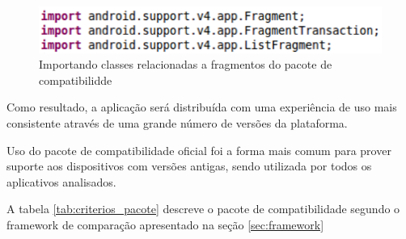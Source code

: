 \begin{figure}[ht]
\centering
\includegraphics{imagens/import_fragment_compat.png}
\caption{Importando classes relacionadas a fragmentos do pacote de compatibilidde}
\label{fig:import_fragment_compat}
\end{figure}

Como resultado, a aplicação será distribuída com uma experiência de uso mais
consistente através de uma grande número de versões da plataforma.

Uso do pacote de compatibilidade oficial foi a forma mais comum para prover
suporte aos dispositivos com versões antigas, sendo utilizada por todos os
aplicativos analisados.

A tabela \ref{tab:criterios_pacote} descreve o pacote de compatibilidade
segundo o framework de comparação apresentado na seção \ref{sec:framework}

